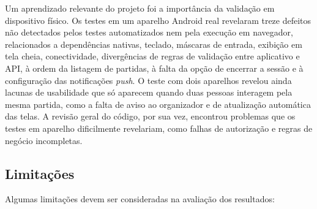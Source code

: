 \documentclass[a4paper, 12pt]{article}
\begin{document}
\begin{justify}
Um aprendizado relevante do projeto foi a importância da validação em dispositivo físico. Os testes em um aparelho Android real revelaram treze defeitos não detectados pelos testes automatizados nem pela execução em navegador, relacionados a dependências nativas, teclado, máscaras de entrada, exibição em tela cheia, conectividade, divergências de regras de validação entre aplicativo e API, à ordem da listagem de partidas, à falta da opção de encerrar a sessão e à configuração das notificações \textit{push}. O teste com dois aparelhos revelou ainda lacunas de usabilidade que só aparecem quando duas pessoas interagem pela mesma partida, como a falta de aviso ao organizador e de atualização automática das telas. A revisão geral do código, por sua vez, encontrou problemas que os testes em aparelho dificilmente revelariam, como falhas de autorização e regras de negócio incompletas.

\subsection{Limitações}

Algumas limitações devem ser consideradas na avaliação dos resultados:


\end{justify}
\end{document}
